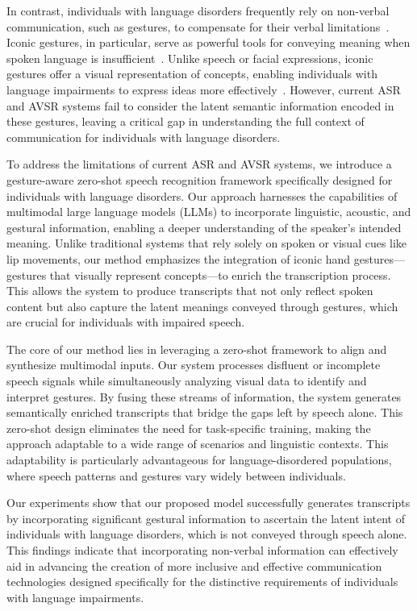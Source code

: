 In contrast, individuals with language disorders frequently rely on non-verbal communication, such as gestures, to compensate for their verbal limitations~\cite{stark2023demographic}. Iconic gestures, in particular, serve as powerful tools for conveying meaning when spoken language is insufficient~\cite{de2023does,van2017production,stark2022task,stark2023demographic}. Unlike speech or facial expressions, iconic gestures offer a visual representation of concepts, enabling individuals with language impairments to express ideas more effectively~\cite{lee2023learning}. However, current ASR and AVSR systems fail to consider the latent semantic information encoded in these gestures, leaving a critical gap in understanding the full context of communication for individuals with language disorders.

To address the limitations of current ASR and AVSR systems, we introduce a gesture-aware zero-shot speech recognition framework specifically designed for individuals with language disorders. Our approach harnesses the capabilities of multimodal large language models (LLMs) to incorporate linguistic, acoustic, and gestural information, enabling a deeper understanding of the speaker's intended meaning. Unlike traditional systems that rely solely on spoken or visual cues like lip movements, our method emphasizes the integration of iconic hand gestures—gestures that visually represent concepts—to enrich the transcription process. This allows the system to produce transcripts that not only reflect spoken content but also capture the latent meanings conveyed through gestures, which are crucial for individuals with impaired speech.

The core of our method lies in leveraging a zero-shot framework to align and synthesize multimodal inputs. Our system processes disfluent or incomplete speech signals while simultaneously analyzing visual data to identify and interpret gestures. By fusing these streams of information, the system generates semantically enriched transcripts that bridge the gaps left by speech alone. This zero-shot design eliminates the need for task-specific training, making the approach adaptable to a wide range of scenarios and linguistic contexts. This adaptability is particularly advantageous for language-disordered populations, where speech patterns and gestures vary widely between individuals.

Our experiments show that our proposed model successfully generates transcripts by incorporating significant gestural information to ascertain the latent intent of individuals with language disorders, which is not conveyed through speech alone. This findings indicate that incorporating non-verbal information can effectively aid in advancing the creation of more inclusive and effective communication technologies designed specifically for the distinctive requirements of individuals with language impairments.








